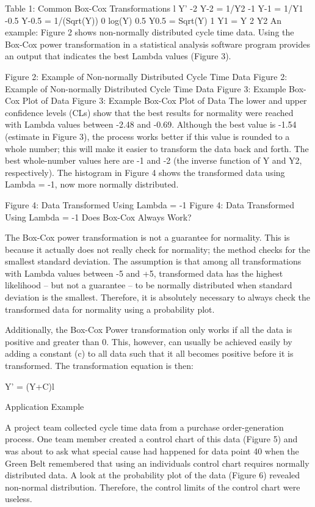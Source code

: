 Table 1: Common Box-Cox Transformations
l	Y’
-2	Y-2 = 1/Y2
-1	Y-1 = 1/Y1
-0.5	Y-0.5 = 1/(Sqrt(Y))
0	log(Y)
0.5	Y0.5 = Sqrt(Y)
1	Y1 = Y
2	Y2
An example: Figure 2 shows non-normally distributed cycle time data. Using the Box-Cox power transformation in a statistical analysis software program provides an output that indicates the best Lambda values (Figure 3).

Figure 2: Example of Non-normally Distributed Cycle Time Data
Figure 2: Example of Non-normally Distributed Cycle Time Data
Figure 3: Example Box-Cox Plot of Data
Figure 3: Example Box-Cox Plot of Data
The lower and upper confidence levels (CLs) show that the best results for normality were reached with Lambda values between -2.48 and -0.69. Although the best value is -1.54 (estimate in Figure 3), the process works better if this value is rounded to a whole number; this will make it easier to transform the data back and forth. The best whole-number values here are -1 and -2 (the inverse function of Y and Y2, respectively). The histogram in Figure 4 shows the transformed data using Lambda = -1, now more normally distributed.

Figure 4: Data Transformed Using Lambda = -1
Figure 4: Data Transformed Using Lambda = -1
Does Box-Cox Always Work?

The Box-Cox power transformation is not a guarantee for normality. This is because it actually does not really check for normality; the method checks for the smallest standard deviation. The assumption is that among all transformations with Lambda values between -5 and +5, transformed data has the highest likelihood – but not a guarantee – to be normally distributed when standard deviation is the smallest. Therefore, it is absolutely necessary to always check the transformed data for normality using a probability plot.

Additionally, the Box-Cox Power transformation only works if all the data is positive and greater than 0. This, however, can usually be achieved easily by adding a constant (c) to all data such that it all becomes positive before it is transformed. The transformation equation is then:

 Y’ = (Y+C)l

Application Example

A project team collected cycle time data from a purchase order-generation process. One team member created a control chart of this data (Figure 5) and was about to ask what special cause had happened for data point 40 when the Green Belt remembered that using an individuals control chart requires normally distributed data. A look at the probability plot of the data (Figure 6) revealed non-normal distribution. Therefore, the control limits of the control chart were useless.

